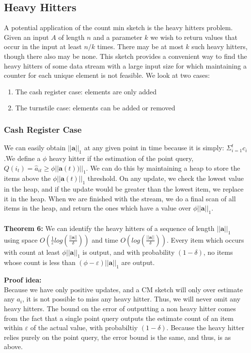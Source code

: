 \documentclass[11pt]{article}
\begin{document}
\subsection{Heavy Hitters}
A potential application of the count min sketch is the heavy hitters problem. Given an input $A$ of length $n$ and a parameter $k$ we wish to return values that occur in the input at least $n/k$ times. There may be at most $k$ such heavy hitters, though there also may be none. This sketch provides a convenient way to find the heavy hitters of some data stream with a large input size for which  maintaining a counter for each unique element is not feasible. We look at two cases:
\begin{enumerate}
\item The cash register case: elements are only added
\item The turnstile case: elements can be added or removed
\end{enumerate}

\subsubsection{Cash Register Case}
We can easily obtain $||\bm{a}||_1$ at any given point in time because it is simply: $\Sigma_{i=1}^t c_i$.We define a $\phi$ heavy hitter if the estimation of the point query, $Q(i_t) =  \hat a_{it} \geq \phi ||\bm{a}(t))||_1$. We can do this by maintaining a heap to store the items above the $\phi||\bm{a}(t)||_1$ threshold. On any update, we check the lowest value in the heap, and if the update would be greater than the lowest item, we replace it in the heap. When we are finished with the stream, we do a final scan of all items in the heap, and return the ones which have a value over $\phi||\bm{a}||_1$.\\\\
\textbf{Theorem 6: } We can identify the heavy hitters of a sequence of length $||\bm{a}||_1$ using space $O(\frac{1}{\varepsilon}log(\frac{||\bm{a}||}{\delta}))$ and time $O(log(\frac{||\bm{a}||}{\delta}))$. Every item which occurs with count at least
$\phi ||\bm{a}||_1$ is output, and with probability $(1-\delta)$, no items whose count is less than $(\phi - \varepsilon)||\bm{a}||_1$ are output.

\textbf{Proof idea:}\\
Because we have only positive updates, and a CM sketch will only over estimate any $a_i$,
it is not possible to miss any heavy hitter. Thus, we will never omit any heavy
hitters. The bound on the error of outputting a non heavy hitter comes from the
fact that a single point query outputs the estimate count of an item within
$\varepsilon$ of the actual value, with probabiltiy $(1-\delta)$. Because the heavy
hitter relies purely on the point query, the error bound is the same, and thus,
is as above.
\end{document}
